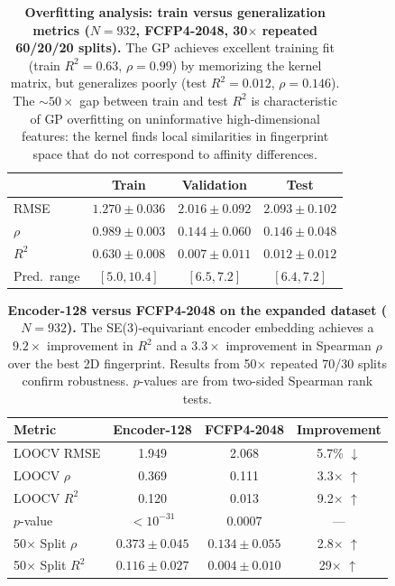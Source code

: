 \documentclass{article}
\begin{document}
\begin{table}[h!]
\centering
\caption{\textbf{Overfitting analysis: train versus generalization
metrics ($N = 932$, FCFP4-2048, 30$\times$ repeated 60/20/20 splits).}
The GP achieves excellent training fit (train $R^{2} = 0.63$,
$\rho = 0.99$) by memorizing the kernel matrix, but generalizes
poorly (test $R^{2} = 0.012$, $\rho = 0.146$).  The ${\sim}50\times$
gap between train and test $R^{2}$ is characteristic of GP overfitting
on uninformative high-dimensional features: the kernel finds local
similarities in fingerprint space that do not correspond to affinity
differences.}
\label{tab:overfitting}
\begin{tabular}{@{}lccc@{}}
\toprule
& Train & Validation & Test \\
\midrule
RMSE       & $1.270 \pm 0.036$ & $2.016 \pm 0.092$ & $2.093 \pm 0.102$ \\
$\rho$     & $0.989 \pm 0.003$ & $0.144 \pm 0.060$ & $0.146 \pm 0.048$ \\
$R^{2}$    & $0.630 \pm 0.008$ & $0.007 \pm 0.011$ & $0.012 \pm 0.012$ \\
Pred.\ range & $[5.0, 10.4]$ & $[6.5, 7.2]$ & $[6.4, 7.2]$ \\
\bottomrule
\end{tabular}
\end{table}

\begin{table}[h!]
\centering
\caption{\textbf{Encoder-128 versus FCFP4-2048 on the expanded dataset
($N = 932$).}
The SE(3)-equivariant encoder embedding achieves a $9.2\times$
improvement in $R^{2}$ and a $3.3\times$ improvement in Spearman $\rho$
over the best 2D fingerprint.  Results from 50$\times$ repeated 70/30
splits confirm robustness.  $p$-values are from two-sided Spearman rank
tests.}
\label{tab:encoder_v_fcfp}
\begin{tabular}{@{}lccc@{}}
\toprule
Metric & Encoder-128 & FCFP4-2048 & Improvement \\
\midrule
LOOCV RMSE      & 1.949  & 2.068  & 5.7\% $\downarrow$ \\
LOOCV $\rho$    & 0.369  & 0.111  & 3.3$\times$ $\uparrow$ \\
LOOCV $R^{2}$   & 0.120  & 0.013  & 9.2$\times$ $\uparrow$ \\
$p$-value       & $<10^{-31}$ & 0.0007 & --- \\
\midrule
50$\times$ Split $\rho$   & $0.373 \pm 0.045$ & $0.134 \pm 0.055$ & 2.8$\times$ $\uparrow$ \\
50$\times$ Split $R^{2}$  & $0.116 \pm 0.027$ & $0.004 \pm 0.010$ & 29$\times$ $\uparrow$ \\
\bottomrule
\end{tabular}
\end{table}
\end{document}
